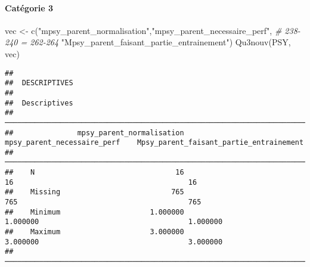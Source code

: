\documentclass[
]{article}
\newenvironment{Shaded}{\begin{snugshade}}{\end{snugshade}}
\newcommand{\CommentTok}[1]{\textcolor[rgb]{0.56,0.35,0.01}{\textit{#1}}}
\newcommand{\FunctionTok}[1]{\textcolor[rgb]{0.00,0.00,0.00}{#1}}
\newcommand{\NormalTok}[1]{#1}
\newcommand{\OtherTok}[1]{\textcolor[rgb]{0.56,0.35,0.01}{#1}}
\newcommand{\StringTok}[1]{\textcolor[rgb]{0.31,0.60,0.02}{#1}}
\begin{document}
\hypertarget{catuxe9gorie-3-2}{%
\paragraph{Catégorie 3}\label{catuxe9gorie-3-2}}

\begin{Shaded}
\begin{Highlighting}[]
\NormalTok{vec }\OtherTok{\textless{}{-}} \FunctionTok{c}\NormalTok{(}\StringTok{"mpsy\_parent\_normalisation"}\NormalTok{,}\StringTok{"mpsy\_parent\_necessaire\_perf"}\NormalTok{,  }\CommentTok{\# 238{-}240 = 262{-}264}
                 \StringTok{"Mpsy\_parent\_faisant\_partie\_entrainement"}\NormalTok{)}
\FunctionTok{Qu3nouv}\NormalTok{(PSY, vec)}
\end{Highlighting}
\end{Shaded}

\begin{verbatim}
## 
##  DESCRIPTIVES
## 
##  Descriptives                                                                                                       
##  ────────────────────────────────────────────────────────────────────────────────────────────────────────────────── 
##               mpsy_parent_normalisation    mpsy_parent_necessaire_perf    Mpsy_parent_faisant_partie_entrainement   
##  ────────────────────────────────────────────────────────────────────────────────────────────────────────────────── 
##    N                                 16                             16                                         16   
##    Missing                          765                            765                                        765   
##    Minimum                     1.000000                       1.000000                                   1.000000   
##    Maximum                     3.000000                       3.000000                                   3.000000   
##  ──────────────────────────────────────────────────────────────────────────────────────────────────────────────────
\end{verbatim}
\end{document}
